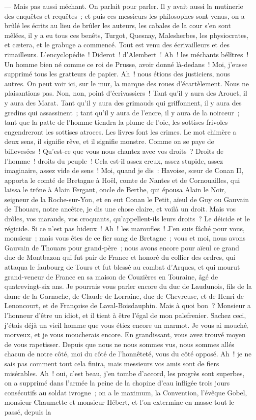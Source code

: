 \documentclass[french,twoside]{book} %
\begin{document}
— Mais pas aussi méchant. On parlait pour parler. Il y avait aussi la mutinerie des enquêtes et requêtes ; et puis ces messieurs les philosophes sont venus, on a brûlé les écrits au lieu de brûler les auteurs, les cabales de la cour s’en sont mêlées, il y a eu tous ces benêts, Turgot, Quesnay, Malesherbes, les physiocrates, et cætera, et le grabuge a commencé. Tout est venu des écrivailleurs et des rimailleurs. L’encyclopédie ! Diderot ! d’Alembert ! Ah ! les méchants bélîtres ! Un homme bien né comme ce roi de Prusse, avoir donné là-dedans ! Moi, j’eusse supprimé tous les gratteurs de papier. Ah ! nous étions des justiciers, nous autres. On peut voir ici, sur le mur, la marque des roues d’écartèlement. Nous ne plaisantions pas. Non, non, point d’écrivassiers ! Tant qu’il y aura des Arouet, il y aura des Marat. Tant qu’il y aura des grimauds qui griffonnent, il y aura des gredins qui assassinent ; tant qu’il y aura de l’encre, il y aura de la noirceur ; tant que la patte de l’homme tiendra la plume de l’oie, les sottises frivoles engendreront les sottises atroces. Les livres font les crimes. Le mot chimère a deux sens, il signifie rêve,  et il signifie monstre. Comme on se paye de billevesées ! Qu’est-ce que vous nous chantez avec vos droits ? Droits de l’homme ! droits du peuple ! Cela est-il assez creux, assez stupide, assez imaginaire, assez vide de sens ! Moi, quand je dis : Havoise, sœur de Conan II, apporta le comté de Bretagne à Hoël, comte de Nantes et de Cornouailles, qui laissa le trône à Alain Fergant, oncle de Berthe, qui épousa Alain le Noir, seigneur de la Roche-sur-Yon, et en eut Conan le Petit, aïeul de Guy ou Gauvain de Thouars, notre ancêtre, je dis une chose claire, et voilà un droit. Mais vos drôles, vos marauds, vos croquants, qu’appellent-ils leurs droits ? Le déicide et le régicide. Si ce n’est pas hideux ! Ah ! les maroufles ! J’en suis fâché pour vous, monsieur ; mais vous êtes de ce fier sang de Bretagne ; vous et moi, nous avons Gauvain de Thouars pour grand-père ; nous avons encore pour aïeul ce grand duc de Montbazon qui fut pair de France et honoré du collier des ordres, qui attaqua le faubourg de Tours et fut blessé au combat d’Arques, et qui mourut grand-veneur de France en sa maison de Couzières en Touraine, âgé de quatrevingt-six ans. Je pourrais vous parler encore du duc de Laudunois, fils de la dame de la Garnache, de Claude de Lorraine, duc de Chevreuse, et de Henri de Lenoncourt, et de Françoise de Laval-Boisdauphin. Mais à quoi bon ? Monsieur a l’honneur d’être un idiot, et il tient à être l’égal de mon palefrenier. Sachez ceci, j’étais déjà un vieil homme que vous étiez encore un marmot. Je vous ai mouché, morveux, et je vous moucherais encore. En  grandissant, vous avez trouvé moyen de vous rapetisser. Depuis que nous ne nous sommes vus, nous sommes allés chacun de notre côté, moi du côté de l’honnêteté, vous du côté opposé. Ah ! je ne sais pas comment tout cela finira, mais messieurs vos amis sont de fiers misérables. Ah ! oui, c’est beau, j’en tombe d’accord, les progrès sont superbes, on a supprimé dans l’armée la peine de la chopine d’eau infligée trois jours consécutifs au soldat ivrogne ; on a le maximum, la Convention, l’évêque Gobel, monsieur Chaumette et monsieur Hébert, et l’on extermine en masse tout le passé, depuis la 
\end{document}

